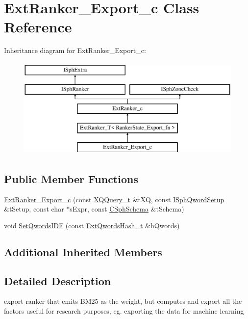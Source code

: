 \hypertarget{classExtRanker__Export__c}{\section{Ext\-Ranker\-\_\-\-Export\-\_\-c Class Reference}
\label{classExtRanker__Export__c}
}
Inheritance diagram for Ext\-Ranker\-\_\-\-Export\-\_\-c\-:\begin{figure}[H]
\begin{center}
\leavevmode
\includegraphics[height=5.000000cm]{classExtRanker__Export__c}
\end{center}
\end{figure}
\subsection*{Public Member Functions}
\begin{DoxyCompactItemize}
\item 
\hyperlink{classExtRanker__Export__c_a91ebc71ee470d14cc4865b21917a2786}{Ext\-Ranker\-\_\-\-Export\-\_\-c} (const \hyperlink{structXQQuery__t}{X\-Q\-Query\-\_\-t} \&t\-X\-Q, const \hyperlink{classISphQwordSetup}{I\-Sph\-Qword\-Setup} \&t\-Setup, const char $\ast$s\-Expr, const \hyperlink{classCSphSchema}{C\-Sph\-Schema} \&t\-Schema)
\item 
void \hyperlink{classExtRanker__Export__c_a5c51222f9d4d871109e696f28bf0c634}{Set\-Qwords\-I\-D\-F} (const \hyperlink{sphinxsearch_8cpp_a814fc096e1ffb29d072d79b72b702fe6}{Ext\-Qwords\-Hash\-\_\-t} \&h\-Qwords)
\end{DoxyCompactItemize}
\subsection*{Additional Inherited Members}


\subsection{Detailed Description}
export ranker that emits B\-M25 as the weight, but computes and export all the factors useful for research purposes, eg. exporting the data for machine learning 

